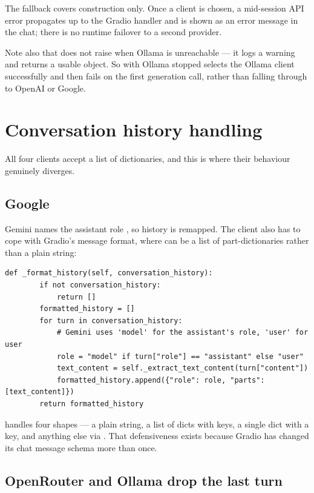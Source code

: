 The fallback covers construction only. Once a client is chosen, a mid-session API error propagates up to the Gradio handler and is shown as an error message in the chat; there is no runtime failover to a second provider.

Note also that  does not raise when Ollama is unreachable --- it logs a warning and returns a usable object. So  with Ollama stopped selects the Ollama client successfully and then fails on the first generation call, rather than falling through to OpenAI or Google.

\section{Conversation history handling}

All four clients accept a  list of  dictionaries, and this is where their behaviour genuinely diverges.

\subsection{Google}

Gemini names the assistant role , so history is remapped. The client also has to cope with Gradio's message format, where  can be a list of part-dictionaries rather than a plain string:

\begin{lstlisting}[style=py,firstnumber=62]
    def _format_history(self, conversation_history):
        if not conversation_history:
            return []
        formatted_history = []
        for turn in conversation_history:
            # Gemini uses 'model' for the assistant's role, 'user' for user
            role = "model" if turn["role"] == "assistant" else "user"
            text_content = self._extract_text_content(turn["content"])
            formatted_history.append({"role": role, "parts": [text_content]})
        return formatted_history
\end{lstlisting}

 handles four shapes --- a plain string, a list of dicts with  keys, a single dict with a  key, and anything else via . That defensiveness exists because Gradio has changed its chat message schema more than once.

\subsection{OpenRouter and Ollama drop the last turn}

